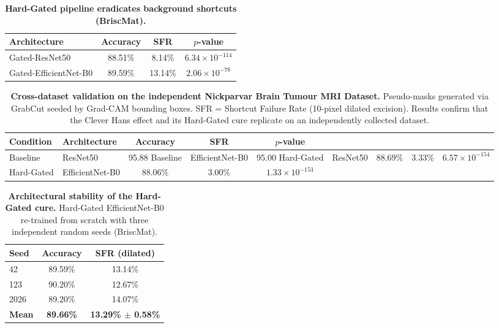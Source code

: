 \begin{table}[h]
\centering
\caption{\textbf{Hard-Gated pipeline eradicates background shortcuts
(BriscMat).}}
\label{tab:gated_briscmat}
\begin{tabular}{lccc}
\toprule
\textbf{Architecture} & \textbf{Accuracy} & \textbf{SFR} & \textbf{$p$-value} \\
\midrule
  Gated-ResNet50        & 88.51\% & 8.14\% & $6.34\times10^{-114}$ \\
  Gated-EfficientNet-B0 & 89.59\% & 13.14\% & $2.06\times10^{-78}$ \\
\bottomrule
\end{tabular}
\end{table}


\begin{table}[h]
\centering
\caption{\textbf{Cross-dataset validation on the independent Nickparvar
Brain Tumour MRI Dataset.} Pseudo-masks generated via GrabCut seeded by
Grad-CAM bounding boxes. SFR = Shortcut Failure Rate (10-pixel dilated
excision). Results confirm that the Clever Hans effect and its Hard-Gated
cure replicate on an independently collected dataset.}
\label{tab:cross_dataset}
\begin{tabular}{llccc}
\toprule
\textbf{Condition} & \textbf{Architecture} & \textbf{Accuracy} &
  \textbf{SFR} & \textbf{$p$-value} \\
\midrule
  Baseline & ResNet50 & 95.88%
  Baseline & EfficientNet-B0 & 95.00%
\midrule
  Hard-Gated & ResNet50 & 88.69\% & 3.33\% & $6.57\times10^{-154}$ \\
  Hard-Gated & EfficientNet-B0 & 88.06\% & 3.00\% & $1.33\times10^{-153}$ \\
\bottomrule
\end{tabular}
\end{table}


\begin{table}[h]
\centering
\caption{\textbf{Architectural stability of the Hard-Gated cure.}
Hard-Gated EfficientNet-B0 re-trained from scratch with three independent
random seeds (BriscMat).}
\label{tab:variance}
\begin{tabular}{lcc}
\toprule
\textbf{Seed} & \textbf{Accuracy} & \textbf{SFR (dilated)} \\
\midrule
  42 & 89.59\% & 13.14\% \\
  123 & 90.20\% & 12.67\% \\
  2026 & 89.20\% & 14.07\% \\
\midrule
  \textbf{Mean} & \textbf{89.66\%} & \textbf{13.29\% $\pm$ 0.58\%} \\
\bottomrule
\end{tabular}
\end{table}
